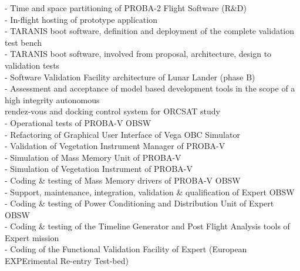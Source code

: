 \documentclass{article}
\begin{document}
\hspace*{0.6cm} - Time and space partitioning of PROBA-2 Flight Software (R\&D) \\
\hspace*{0.6cm} - In-flight hosting of prototype application \\
\hspace*{0.6cm} - TARANIS boot software, definition and deployment of the complete validation test bench \\
\hspace*{0.6cm} - TARANIS boot software, involved from proposal, architecture, design to validation tests \\
\hspace*{0.6cm} - Software Validation Facility architecture of Lunar Lander (phase B) \\
\hspace*{0.6cm} - Assessment and acceptance of model based development tools in the scope of a high integrity autonomous \\
\hspace*{0.85cm} rendez-vous and docking control system for ORCSAT study \\
\hspace*{0.6cm} - Operational tests of PROBA-V OBSW \\
\hspace*{0.6cm} - Refactoring of Graphical User Interface of Vega OBC Simulator \\
\hspace*{0.6cm} - Validation of Vegetation Instrument Manager of PROBA-V \\
\hspace*{0.6cm} - Simulation of Mass Memory Unit of PROBA-V \\
\hspace*{0.6cm} - Simulation of Vegetation Instrument of PROBA-V \\
\hspace*{0.6cm} - Coding \& testing of Mass Memory drivers of PROBA-V OBSW \\
\hspace*{0.6cm} - Support, maintenance, integration, validation \& qualification of Expert OBSW \\
\hspace*{0.6cm} - Coding \& testing of Power Conditioning and Distribution Unit of Expert OBSW \\
\hspace*{0.6cm} - Coding \& testing of the Timeline Generator and Post Flight Analysis tools of Expert mission \\
\hspace*{0.6cm} - Coding of the Functional Validation Facility of Expert (European EXPErimental Re-entry Test-bed) \\
\vspace{0.3cm} 
\end{document}
